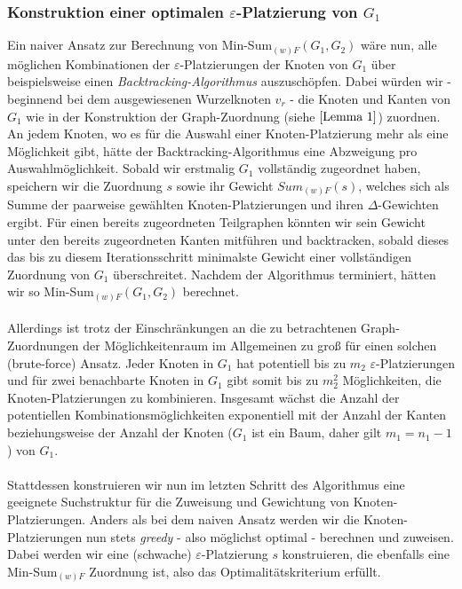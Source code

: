 \documentclass[a4paper, 12pt, twoside]{article}
\theoremstyle{Format1} %
\begin{document}
\subsubsection{Konstruktion einer optimalen $\varepsilon$-Platzierung von $G_1$}
Ein naiver Ansatz zur Berechnung von Min-Sum$_{(w)F}(G_1,G_2)$ wäre nun, alle möglichen Kombinationen der $\varepsilon$-Platzierungen der Knoten von $G_1$ über beispielsweise einen
\textit{Backtracking-Algorithmus} auszuschöpfen.
Dabei würden wir - beginnend bei dem ausgewiesenen Wurzelknoten $v_r$ - die Knoten und Kanten von $G_1$ wie in der Konstruktion der Graph-Zuordnung (siehe $\ref{Lemma 1}$) zuordnen.
An jedem Knoten, wo es für die Auswahl einer Knoten-Platzierung mehr als eine Möglichkeit gibt, hätte der Backtracking-Algorithmus eine Abzweigung pro Auswahlmöglichkeit.
Sobald wir erstmalig $G_1$ vollständig zugeordnet haben, speichern wir die Zuordnung $s$ sowie ihr Gewicht $Sum_{(w)F}(s)$, welches sich als Summe der
paarweise gewählten Knoten-Platzierungen und ihren $\Delta$-Gewichten ergibt.
Für einen bereits zugeordneten Teilgraphen könnten wir sein Gewicht unter den bereits zugeordneten Kanten mitführen und backtracken, sobald dieses das bis zu diesem Iterationsschritt
minimalste Gewicht einer vollständigen Zuordnung von $G_1$ überschreitet. Nachdem der Algorithmus terminiert, hätten wir so Min-Sum$_{(w)F}(G_1,G_2)$ berechnet.
\\
\\
Allerdings ist trotz der Einschränkungen an die zu betrachtenen Graph-Zuordnungen der Möglichkeitenraum im Allgemeinen zu groß
für einen solchen (brute-force) Ansatz.
Jeder Knoten in $G_1$ hat potentiell bis zu $m_2$ $\varepsilon$-Platzierungen und für
zwei benachbarte Knoten in $G_1$ gibt somit bis zu $m_2^2$ Möglichkeiten, die Knoten-Platzierungen zu kombinieren.
Insgesamt wächst die Anzahl der potentiellen Kombinationsmöglichkeiten exponentiell mit der Anzahl der Kanten beziehungsweise der Anzahl der Knoten
($G_1$ ist ein Baum, daher gilt $m_1 = n_1-1$) von $G_1$.
\\
\\
Stattdessen konstruieren wir nun im letzten Schritt des Algorithmus eine geeignete Suchstruktur für die Zuweisung und Gewichtung von Knoten-Platzierungen.
Anders als bei dem naiven Ansatz werden wir die Knoten-Platzierungen nun stets \textit{greedy} - also möglichst optimal - berechnen und zuweisen.
Dabei werden wir eine (schwache) $\varepsilon$-Platzierung $s$ konstruieren, die ebenfalls eine Min-Sum$_{(w)F}$ Zuordnung ist, also das Optimalitätskriterium erfüllt.
\\
\\
\end{document}
